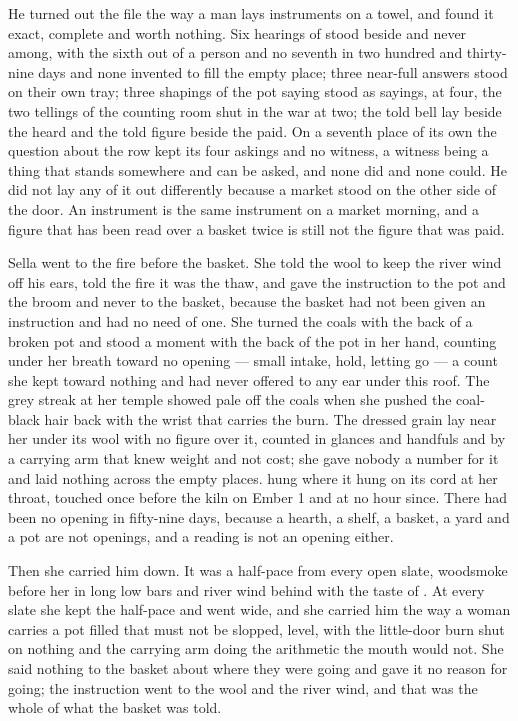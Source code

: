 He turned out the file the way a man lays instruments on a towel, and found it exact, complete and worth nothing. Six hearings of  stood beside and never among, with the sixth out of a person and no seventh in two hundred and thirty-nine days and none invented to fill the empty place; three near-full answers stood on their own tray; three shapings of the pot saying stood as sayings,  at four, the two tellings of the counting room shut in the war at two; the told bell lay beside the heard and the told figure beside the paid. On a seventh place of its own the question about the row kept its four askings and no witness, a witness being a thing that stands somewhere and can be asked, and none did and none could. He did not lay any of it out differently because a market stood on the other side of the door. An instrument is the same instrument on a market morning, and a figure that has been read over a basket twice is still not the figure that was paid.

Sella went to the fire before the basket. She told the wool to keep the river wind off his ears, told the fire it was the thaw, and gave the instruction to the pot and the broom and never to the basket, because the basket had not been given an instruction and had no need of one. She turned the coals with the back of a broken pot and stood a moment with the back of the pot in her hand, counting under her breath toward no opening --- small intake, hold, letting go --- a count she kept toward nothing and had never offered to any ear under this roof. The grey streak at her temple showed pale off the coals when she pushed the coal-black hair back with the wrist that carries the burn. The dressed grain lay near her under its wool with no figure over it, counted in glances and handfuls and by a carrying arm that knew weight and not cost; she gave nobody a number for it and laid nothing across the empty places.  hung where it hung on its cord at her throat, touched once before the kiln on Ember 1 and at no hour since. There had been no opening in fifty-nine days, because a hearth, a shelf, a basket, a yard and a pot are not openings, and a reading is not an opening either.

Then she carried him down. It was a half-pace from every open slate, woodsmoke before her in long low bars and river wind behind with the taste of . At every slate she kept the half-pace and went wide, and she carried him the way a woman carries a pot filled that must not be slopped, level, with the little-door burn shut on nothing and the carrying arm doing the arithmetic the mouth would not. She said nothing to the basket about where they were going and gave it no reason for going; the instruction went to the wool and the river wind, and that was the whole of what the basket was told.

